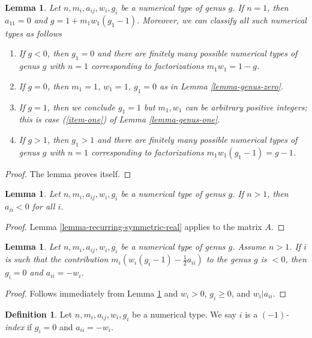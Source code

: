 \documentclass[10pt,a4paper]{amsart}
\theoremstyle{plain}
\newtheorem{lemma}[subsection]{Lemma}
\theoremstyle{definition}
\newtheorem{definition}[subsection]{Definition}
\theoremstyle{remark}
\numberwithin{equation}{subsection}
\begin{document}
\begin{lemma}
\label{lemma-irreducible}
Let $n, m_i, a_{ij}, w_i, g_i$ be a numerical type of genus $g$.
If $n = 1$, then $a_{11} = 0$ and $g = 1 + m_1w_1(g_1 - 1)$.
Moreover, we can classify all such numerical types as follows
\begin{enumerate}
\item If $g < 0$, then $g_1 = 0$ and there are finitely many possible
numerical types of genus $g$ with $n = 1$ corresponding to factorizations
$m_1w_1 = 1 - g$.
\item If $g = 0$, then $m_1 = 1$, $w_1 = 1$, $g_1 = 0$
as in Lemma \ref{lemma-genus-zero}.
\item If $g = 1$, then we conclude $g_1 = 1$ but $m_1, w_1$ can be arbitrary
positive integers; this is case
(\ref{item-one}) of Lemma \ref{lemma-genus-one}.
\item If $g > 1$, then $g_1 > 1$ and there are finitely many possible
numerical types of genus $g$ with $n = 1$ corresponding to
factorizations $m_1w_1(g_1 - 1) = g - 1$.
\end{enumerate}
\end{lemma}

\begin{proof}
The lemma proves itself.
\end{proof}

\begin{lemma}
\label{lemma-diagonal-negative}
Let $n, m_i, a_{ij}, w_i, g_i$ be a numerical type of genus $g$.
If $n > 1$, then $a_{ii} < 0$ for all $i$.
\end{lemma}

\begin{proof}
Lemma \ref{lemma-recurring-symmetric-real} applies to the matrix $A$.
\end{proof}

\begin{lemma}
\label{lemma-minus-one}
Let $n, m_i, a_{ij}, w_i, g_i$ be a numerical type of genus $g$.
Assume $n > 1$. If $i$ is such that the contribution
$m_i(w_i(g_i - 1) - \frac{1}{2} a_{ii})$
to the genus $g$ is $< 0$, then $g_i = 0$ and $a_{ii} = -w_i$.
\end{lemma}

\begin{proof}
Follows immediately from Lemma \ref{lemma-diagonal-negative} and
$w_i > 0$, $g_i \geq 0$, and $w_i | a_{ii}$.
\end{proof}

\begin{definition}
\label{definition-type-minus-one}
Let $n, m_i, a_{ij}, w_i, g_i$ be a numerical type.
We say $i$ is a {\it $(-1)$-index} if $g_i = 0$ and $a_{ii} = -w_i$.
\end{definition}
\end{document}
